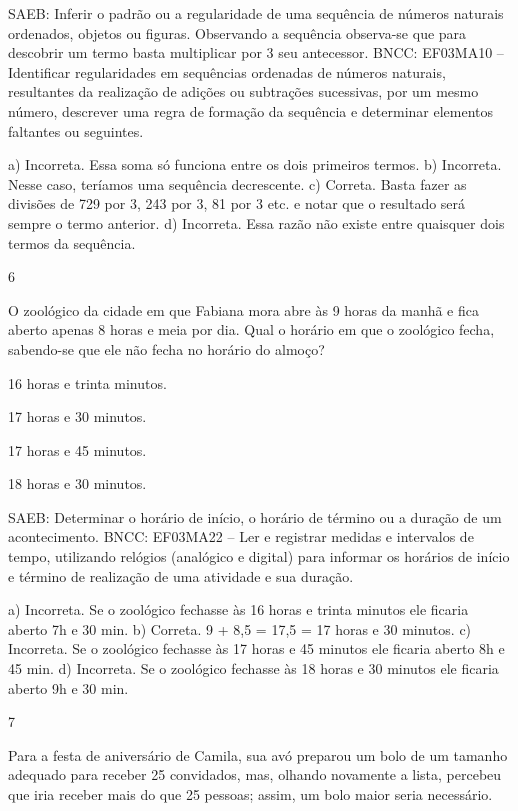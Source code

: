 \begin{multicols}{2}
{\begin{escolha}
{SAEB: Inferir o padrão ou a regularidade de uma sequência de números naturais ordenados, objetos ou figuras. Observando a sequência observa-se que para descobrir um termo basta multiplicar por 3 seu antecessor.
BNCC: EF03MA10 -- Identificar regularidades em sequências ordenadas de números naturais,
resultantes da realização de adições ou subtrações sucessivas, por um mesmo número,
descrever uma regra de formação da sequência e determinar elementos faltantes ou seguintes.

a) Incorreta. Essa soma só funciona entre os dois primeiros termos.
b) Incorreta. Nesse caso, teríamos uma sequência decrescente.
c) Correta. Basta fazer as divisões de 729 por 3, 243 por 3, 81 por 3 etc. e notar que o resultado será sempre o termo anterior.
d) Incorreta. Essa razão não existe entre quaisquer dois termos da sequência.

\num{6}

O zoológico da cidade em que Fabiana mora abre às 9 horas da manhã e fica aberto apenas 8 horas e meia por dia. Qual o horário em que o zoológico fecha, sabendo-se que ele não fecha no horário do almoço?

\begin{escolha}
\item
  16 horas e trinta minutos.
\item
  17 horas e 30 minutos.
\item
  17 horas e 45 minutos.
\item
  18 horas e 30 minutos.
\end{escolha}

SAEB: Determinar o horário de início, o horário de término ou a duração de um acontecimento.
BNCC: EF03MA22 -- Ler e registrar medidas e intervalos de tempo, utilizando relógios (analógico e
digital) para informar os horários de início e término de realização de uma atividade e sua duração.

a) Incorreta. Se o zoológico fechasse às 16 horas e trinta minutos ele ficaria aberto 7h e 30 min.
b) Correta. 9 + 8,5 = 17,5 = 17 horas e 30 minutos.
c) Incorreta. Se o zoológico fechasse às 17 horas e 45 minutos ele ficaria aberto 8h e 45 min.
d) Incorreta. Se o zoológico fechasse às 18 horas e 30 minutos ele ficaria aberto 9h e 30 min.

\num{7}

Para a festa de aniversário de Camila, sua avó preparou um bolo de um tamanho adequado para receber 25 convidados, mas, olhando novamente a lista, percebeu que iria receber mais do que 25 pessoas; assim, um bolo maior seria necessário.

}
\end{escolha}}
\end{multicols}
